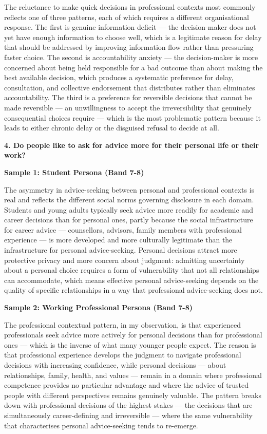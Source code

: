 The reluctance to make quick decisions in professional contexts most commonly reflects one of three patterns, each of which requires a different organisational response. The first is genuine information deficit — the decision-maker does not yet have enough information to choose well, which is a legitimate reason for delay that should be addressed by improving information flow rather than pressuring faster choice. The second is accountability anxiety — the decision-maker is more concerned about being held responsible for a bad outcome than about making the best available decision, which produces a systematic preference for delay, consultation, and collective endorsement that distributes rather than eliminates accountability. The third is a preference for reversible decisions that cannot be made reversible — an unwillingness to accept the irreversibility that genuinely consequential choices require — which is the most problematic pattern because it leads to either chronic delay or the disguised refusal to decide at all.

\separator

\begin{ieltsquestion}
\textbf{4. Do people like to ask for advice more for their personal life or their work?}
\end{ieltsquestion}
\textbf{Sample 1: Student Persona (Band 7-8)}

The asymmetry in advice-seeking between personal and professional contexts is real and reflects the different social norms governing disclosure in each domain. Students and young adults typically seek advice more readily for academic and career decisions than for personal ones, partly because the social infrastructure for career advice — counsellors, advisors, family members with professional experience — is more developed and more culturally legitimate than the infrastructure for personal advice-seeking. Personal decisions attract more protective privacy and more concern about judgment: admitting uncertainty about a personal choice requires a form of vulnerability that not all relationships can accommodate, which means effective personal advice-seeking depends on the quality of specific relationships in a way that professional advice-seeking does not.

\textbf{Sample 2: Working Professional Persona (Band 7-8)}

The professional contextual pattern, in my observation, is that experienced professionals seek advice more actively for personal decisions than for professional ones — which is the inverse of what many younger people expect. The reason is that professional experience develops the judgment to navigate professional decisions with increasing confidence, while personal decisions — about relationships, family, health, and values — remain in a domain where professional competence provides no particular advantage and where the advice of trusted people with different perspectives remains genuinely valuable. The pattern breaks down with professional decisions of the highest stakes — the decisions that are simultaneously career-defining and irreversible — where the same vulnerability that characterises personal advice-seeking tends to re-emerge.


